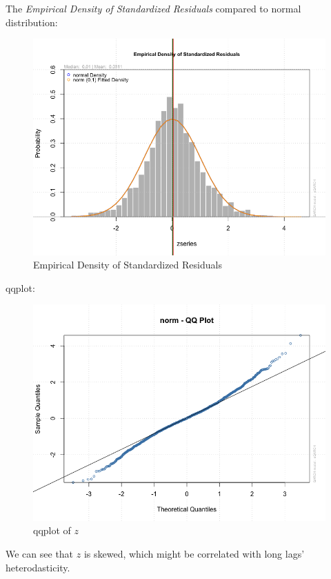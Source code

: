 \documentclass[a4paper, 11pt]{article}
\begin{document}
The \textit{Empirical Density of Standardized Residuals} compared to normal distribution:
\begin{figure}[H]
\centering
\caption{Empirical Density of Standardized Residuals}
\includegraphics[scale=.60]{density.png}
\end{figure}
 
qqplot:
\begin{figure}[H]
\centering
\caption{qqplot of $z$}
\includegraphics[scale=.60]{qqplot.png}
\end{figure}

\indent We can see that $z$ is skewed, which might be correlated with long lags' heterodasticity.\par
\end{document}
